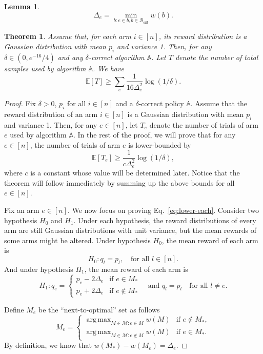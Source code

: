 \documentclass{article}
\newtheorem{lemma}{Lemma}
\newtheorem{theorem}{Theorem}
\newcommand{\E}{\mathbb E}
\newcommand{\M}{\mathcal M}
\newcommand{\Bopt}{\mathcal B_{\mathsf{opt}}}
\DeclareMathOperator{\argmax}{arg\,max}
\begin{document}
\begin{spacing}{1.1}
\begin{lemma}
$$
\Delta_e = \min_{b: e \in b, b \in \Bopt} w(b).
$$
\end{lemma}

\begin{theorem}
Assume that, for each arm $i\in [n]$, its reward distribution is a Gaussian distribution with mean $p_i$ and variance 1.
Then, for any $\delta \in (0,e^{-16}/4)$
and any $\delta$-correct algorithm $\mathbb A$.
Let $T$ denote the number of total samples used by algorithm $\mathbb A$.
We have
$$
\E[T] \ge \sum_e \frac{1}{16\Delta_e^2}\log(1/\delta).
$$
\end{theorem}


\begin{proof}
Fix $\delta >0$, $p_i$ for all $i\in[n]$ and a $\delta$-correct policy $\mathbb A$.
Assume that the reward distribution of an arm $i\in [n]$ is a Gaussian distribution with mean $p_i$ and variance 1.
Then, for any $e\in [n]$, let $T_e$ denote the  number of trials of arm $e$ used by algorithm $\mathbb A$.
In the rest of the proof, we will prove that for any $e\in [n]$, the number of trials of arm $e$ is lower-bounded by
\begin{equation}
\E[T_e] \ge \frac{1}{c\Delta_e^2}\log(1/\delta),
\label{eq:lower-each}
\end{equation}
where $c$ is a constant whose value will be determined later.
Notice that the theorem will follow immediately by summing up the above bounds for all $e\in[n]$.


Fix an arm $e\in [n]$. We now focus on proving Eq.~\eqref{eq:lower-each}.
Consider two hypothesis $H_0$ and $H_1$. 
Under each hypothesis, the reward distributions of every arm are still Gaussian distributions with unit variance, but the mean rewards of some arms might be altered.
Under hypothesis $H_0$, the mean reward of each arm is 
$$
H_0: q_l = p_l, \quad \text{for all } l \in [n].
$$
And under hypothesis $H_1$, the mean reward of each arm is 
$$
H_1: q_e = \begin{cases}
	p_e-2\Delta_e & \text{if } e\in M_*\\
	p_e+2\Delta_e & \text{if } e\not\in M_*
\end{cases} \quad\text{and } q_l = p_l\quad\text{for all } l\not = e.
$$

Define $M_e$ be the ``next-to-optimal'' set as follows 
$$
M_e = \begin{cases}
		 \argmax_{M\in \M: e \in M} w(M) & \text{if } e\not \in M_*, \\
	     \argmax_{M\in \M: e \not\in M} w(M) & \text{if } e\in M_*.
	  \end{cases}
$$
By definition, we know that $w(M_*)-w(M_e)=\Delta_e$.


\end{proof}
\end{spacing}
\end{document}
